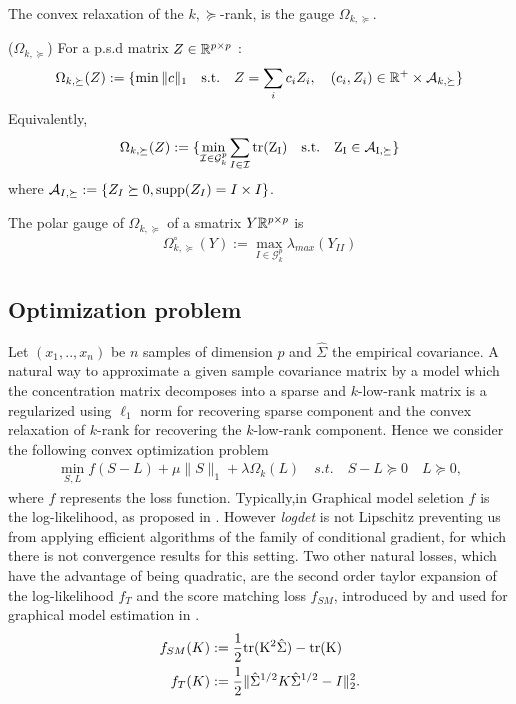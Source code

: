 The convex relaxation of the $k,\succeq$-rank, is the gauge $\Omega_{k,\succeq}$. 

\begin{mydef}
($\Omega_{k,\succeq}$) For a p.s.d  matrix $Z\in\mathbb{R}^{p\times p}$  :
\begin{align}
\Omega_{k,\succeq}(Z):=\{\min \|c\|_1 \quad \text{s.t.} \quad Z=\sum_{i} c_i Z_i, \quad (c_i,Z_i)\in \mathbb{R}^{+}\times\mathcal{A}_{k,\succeq}\}
\end{align}
Equivalently, 
\begin{align}
\Omega_{k,\succeq}(Z):=\{\min_{\mathcal{I}\in\mathcal{G}^p_k} \sum_{I\in\mathcal{I}}\rm tr(Z_I) \quad \text{s.t.} \quad Z_I\in\mathcal{A}_{I,\succeq}\}
\end{align}
where  $\mathcal{A}_{I,\succeq}:=\{Z_I\succeq 0 ,\text{supp}(Z_I)=I\times I\}$.
\end{mydef}

\begin{lemm} The polar gauge of $\Omega_{k,\succeq}$ of a smatrix $Y\mathbb{R}^{p\times p}$ is
\begin{align}
\Omega_{k,\succeq}^{\circ}(Y):= \max_{I\in\mathcal{G}^p_k}\lambda_{max}(Y_{II})
\end{align}
\end{lemm}

\subsection{Optimization problem}
Let $(x_1,..,x_n)$ be $n$ samples of dimension $p$ and   $\hat{\Sigma}$ the empirical covariance. A natural way to approximate a given sample covariance matrix by a model which the concentration matrix decomposes into a sparse and $k$-low-rank matrix is a regularized using $\ell_1$ norm for recovering sparse component and the convex relaxation of $k$-rank for recovering the $k$-low-rank component. Hence we consider the following convex optimization problem
\begin{align}
\label{opt}
\min_{S,L} f(S-L)+\mu\|S\|_{1}+\lambda\Omega_k(L) \quad s.t. \quad S-L \succeq 0 \quad L \succeq 0,
\end{align}
where  $f$ represents the loss function. Typically,in Graphical model seletion $f$ is the log-likelihood, as proposed in \citet{chandrasekaran2010}. However \textit{logdet} is not Lipschitz preventing us from applying efficient algorithms of the family of conditional gradient, for which there is not convergence results for this setting.  Two other natural losses, which have the advantage of being quadratic, are the second order taylor expansion of the log-likelihood $f_{T}$ and the score matching loss $f_{SM}$, introduced by \citet{hyvarinen2005estimation} and used for graphical model estimation in \citet{lin2016estimation}.
\begin{align}
f_{SM}(K)&:=\frac{1}{2}\rm tr(K^2 \hat{\Sigma})-\rm tr(K) \\
f_{T}(K)&:=\frac{1}{2}\|\hat{\Sigma}^{1/2}K\hat{\Sigma}^{1/2}-I\|_2^2.
\end{align}

